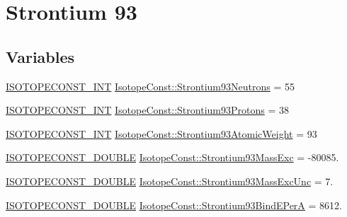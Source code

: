 \hypertarget{group___isotope_const-_strontium-_sr93}{}\section{Strontium 93}
\label{group___isotope_const-_strontium-_sr93}
\subsection*{Variables}
\begin{DoxyCompactItemize}
\item 
\mbox{\hyperlink{group___isotope_const-_macros_ga5f18360b3e99483a35c32d789e62621c}{I\+S\+O\+T\+O\+P\+E\+C\+O\+N\+S\+T\+\_\+\+I\+NT}} \mbox{\hyperlink{group___isotope_const-_strontium-_sr93_gab1ecd561a48b1cc517aea46259ed43c8}{Isotope\+Const\+::\+Strontium93\+Neutrons}} = 55
\item 
\mbox{\hyperlink{group___isotope_const-_macros_ga5f18360b3e99483a35c32d789e62621c}{I\+S\+O\+T\+O\+P\+E\+C\+O\+N\+S\+T\+\_\+\+I\+NT}} \mbox{\hyperlink{group___isotope_const-_strontium-_sr93_gab2ed931d617eac833ddd0a54a358b7d2}{Isotope\+Const\+::\+Strontium93\+Protons}} = 38
\item 
\mbox{\hyperlink{group___isotope_const-_macros_ga5f18360b3e99483a35c32d789e62621c}{I\+S\+O\+T\+O\+P\+E\+C\+O\+N\+S\+T\+\_\+\+I\+NT}} \mbox{\hyperlink{group___isotope_const-_strontium-_sr93_gaf01810801a3b883bf9737530e2942019}{Isotope\+Const\+::\+Strontium93\+Atomic\+Weight}} = 93
\item 
\mbox{\hyperlink{group___isotope_const-_macros_ga8f45a7272ce02c0b4c65c44636ed719a}{I\+S\+O\+T\+O\+P\+E\+C\+O\+N\+S\+T\+\_\+\+D\+O\+U\+B\+LE}} \mbox{\hyperlink{group___isotope_const-_strontium-_sr93_ga0d41a00eacf86550400da168be02f795}{Isotope\+Const\+::\+Strontium93\+Mass\+Exc}} = -\/80085.
\item 
\mbox{\hyperlink{group___isotope_const-_macros_ga8f45a7272ce02c0b4c65c44636ed719a}{I\+S\+O\+T\+O\+P\+E\+C\+O\+N\+S\+T\+\_\+\+D\+O\+U\+B\+LE}} \mbox{\hyperlink{group___isotope_const-_strontium-_sr93_gad794a3015498bd2a497a6abfc6089e45}{Isotope\+Const\+::\+Strontium93\+Mass\+Exc\+Unc}} = 7.
\item 
\mbox{\hyperlink{group___isotope_const-_macros_ga8f45a7272ce02c0b4c65c44636ed719a}{I\+S\+O\+T\+O\+P\+E\+C\+O\+N\+S\+T\+\_\+\+D\+O\+U\+B\+LE}} \mbox{\hyperlink{group___isotope_const-_strontium-_sr93_gaf1d3ab202d260d8c4b295dec67e3bdf9}{Isotope\+Const\+::\+Strontium93\+Bind\+E\+PerA}} = 8612.
\item 

\end{DoxyCompactItemize}
